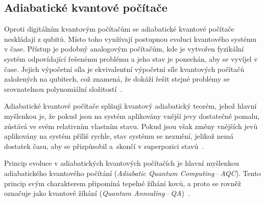 \subsection{Adiabatické kvantové počítače}
Oproti digitálním kvantovým počítačům se adiabatické kvantové počítače neskládají z qubitů. 
Místo toho využívají postupnou evoluci kvantového systému v čase. 
Přístup je podobný analogovým počítačům, kde je vytvořen fyzikální systém odpovídající řešenému problému a jeho stav je ponechán, aby se vyvíjel v čase. 
Jejich výpočetní síla je ekvivalentní výpočetní síle kvantových počítačů založených na qubitech, což znamená, že dokáží řešit stejné problémy se srovnatelnou polynomiální složitostí~\cite{NaturalComputing}.

Adiabatické kvantové počítače splňují kvantový adiabatický teorém, jehož hlavní myšlenkou je, že pokud jsou na systém aplikovány vnější jevy dostatečně pomalu, zůstává ve svém relativním vlastním stavu. 
Pokud jsou však změny vnějších jevů aplikovány na systém příliš rychle, stav systému se nezmění, jelikož nemá dostatek času, aby se přizpůsobil a~skončí v superpozici stavů~\cite{NaturalComputing}. 

Princip evoluce v adiabatických kvantových počítačích je hlavní myšlenkou adiabatického kvantového počítání (\emph{Adiabatic Quantum Computing\,--\,AQC}). 
Tento princip svým charakterem připomíná tepelné žíhání kovů, a proto se rovněž označuje jako kvantové žíhání (\emph{Quantum Annealing\,--\,QA})~\cite{NaturalComputing}. 
